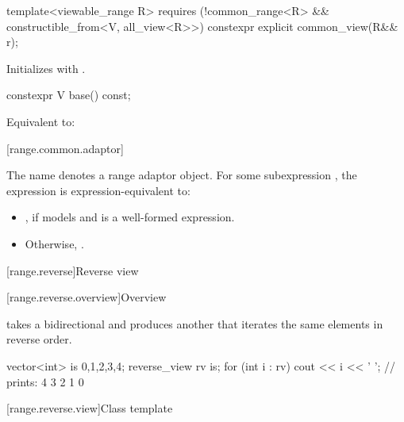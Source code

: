 %
\begin{itemdecl}
template<viewable_range R>
  requires (!common_range<R> && constructible_from<V, all_view<R>>)
constexpr explicit common_view(R&& r);
\end{itemdecl}

\begin{itemdescr}
\pnum
\effects
Initializes  with .
\end{itemdescr}

%
\begin{itemdecl}
constexpr V base() const;
\end{itemdecl}

\begin{itemdescr}
\pnum
\effects
Equivalent to: 
\end{itemdescr}

[range.common.adaptor]{}

\pnum
The name  denotes a
range adaptor object.
For some subexpression ,
the expression  is expression-equivalent to:
\begin{itemize}
\item {},
  if  models 
  and  is a well-formed expression.

\item Otherwise, .
\end{itemize}

[range.reverse]{Reverse view}

[range.reverse.overview]{Overview}

\pnum
{} takes a bidirectional  and produces
another  that iterates the same elements in reverse order.

\pnum
\begin{example}
\begin{codeblock}
vector<int> is {0,1,2,3,4};
reverse_view rv {is};
for (int i : rv)
  cout << i << ' '; // prints: 4 3 2 1 0
\end{codeblock}
\end{example}

[range.reverse.view]{Class template }


